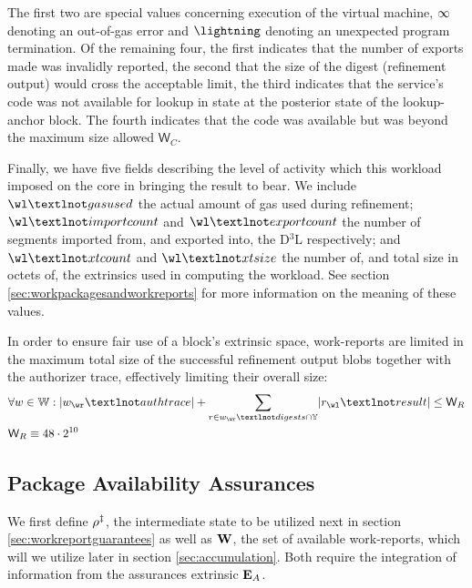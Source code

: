 The first two are special values concerning execution of the virtual machine, $\infty$ denoting an out-of-gas error and $\panic$ denoting an unexpected program termination. Of the remaining four, the first indicates that the number of exports made was invalidly reported, the second that the size of the digest (refinement output) would cross the acceptable limit, the third indicates that the service's code was not available for lookup in state at the posterior state of the lookup-anchor block. The fourth indicates that the code was available but was beyond the maximum size allowed $\mathsf{W}_C$.

Finally, we have five fields describing the level of activity which this workload imposed on the core in bringing the result to bear. We include $\wl¬gasused$ the actual amount of gas used during refinement; $\wl¬importcount$ and $\wl¬exportcount$ the number of segments imported from, and exported into, the D$^3$L respectively; and $\wl¬xtcount$ and $\wl¬xtsize$ the number of, and total size in octets of, the extrinsics used in computing the workload. See section \ref{sec:workpackagesandworkreports} for more information on the meaning of these values.

In order to ensure fair use of a block's extrinsic space, work-reports are limited in the maximum total size of the successful refinement output blobs together with the authorizer trace, effectively limiting their overall size:
\begin{align}
  &\forall w \in \workreport:
    \len{w_\wr¬authtrace} + \sum_{r \in w_\wr¬digests \cap \blob} \len{r_\wl¬result} \le \mathsf{W}_R \\
  &\mathsf{W}_R \equiv 48\cdot2^{10}
\end{align}









\subsection{Package Availability Assurances}

We first define $\rho^\ddagger$, the intermediate state to be utilized next in section \ref{sec:workreportguarantees} as well as $\mathbf{W}$, the set of available work-reports, which will we utilize later in section \ref{sec:accumulation}. Both require the integration of information from the assurances extrinsic $\mathbf{E}_A$.


